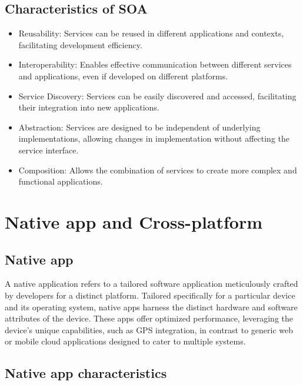 \documentclass[12pt,a4paper, twosite]{article}
\begin{document}
\subsection{Characteristics of SOA}
\label{sec:org94bc543}

\begin{itemize}
  \item Reusability: Services can be reused in different applications and contexts, facilitating development efficiency.
  \item Interoperability: Enables effective communication between different services and applications, even if developed on different platforms.
  \item Service Discovery: Services can be easily discovered and accessed, facilitating their integration into new applications.
  \item Abstraction: Services are designed to be independent of underlying implementations, allowing changes in implementation without affecting the service interface.
  \item Composition: Allows the combination of services to create more complex and functional applications.
\end{itemize}


\newpage


\section{Native app and Cross-platform}
\label{sec:orgb8b6b9b}

\subsection{Native app}
\label{sec:orgb8b6b9c}
A native application refers to a tailored 
software application meticulously crafted by 
developers for a distinct platform. Tailored 
specifically for a particular device and its operating 
system, native apps harness the distinct hardware and 
software attributes of the device. These apps offer optimized 
performance, leveraging the device's unique capabilities, such 
as GPS integration, in contrast to generic web or mobile cloud 
applications designed to cater to multiple systems.

\subsection{Native app characteristics}
\label{sec:orgb8b6b2b}
\end{document}
